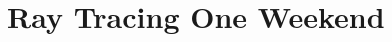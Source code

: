 \documentclass{si_template/cn_note}
\begin{document}
\frontmatter
\mainmatter

\chapter{Ray Tracing One Weekend}


\backmatter
\end{document}
